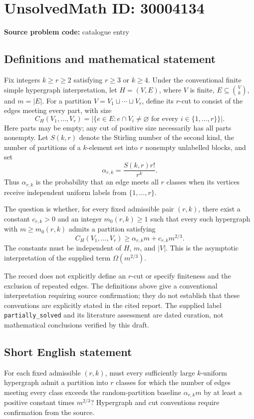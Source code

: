 \documentclass[11pt]{article}
\begin{document}
\section*{UnsolvedMath ID: 30004134}
\textbf{Source problem code:} catalogue entry
\subsection{Definitions and mathematical statement}
Fix integers \(k\ge r\ge2\) satisfying \(r\ge3\) or \(k\ge4\). Under the conventional finite simple hypergraph interpretation, let \(H=(V,E)\), where \(V\) is finite, \(E\subseteq\binom{V}{k}\), and \(m=|E|\). For a partition \(V=V_1\sqcup\cdots\sqcup V_r\), define its \(r\)-cut to consist of the edges meeting every part, with size
\[
C_H(V_1,\ldots,V_r)=\bigl|\{e\in E:e\cap V_i\ne\varnothing\text{ for every }i\in\{1,\ldots,r\}\}\bigr|.
\]
Here parts may be empty; any cut of positive size necessarily has all parts nonempty. Let \(S(k,r)\) denote the Stirling number of the second kind, the number of partitions of a \(k\)-element set into \(r\) nonempty unlabelled blocks, and set
\[
\alpha_{r,k}=\frac{S(k,r)r!}{r^k}.
\]
Thus \(\alpha_{r,k}\) is the probability that an edge meets all \(r\) classes when its vertices receive independent uniform labels from \(\{1,\ldots,r\}\).

The question is whether, for every fixed admissible pair \((r,k)\), there exist a constant \(c_{r,k}>0\) and an integer \(m_0(r,k)\ge1\) such that every such hypergraph with \(m\ge m_0(r,k)\) admits a partition satisfying
\[
C_H(V_1,\ldots,V_r)\ge\alpha_{r,k}m+c_{r,k}m^{2/3}.
\]
The constants must be independent of \(H\), \(m\), and \(|V|\). This is the asymptotic interpretation of the supplied term \(\Omega(m^{2/3})\).

The record does not explicitly define an \(r\)-cut or specify finiteness and the exclusion of repeated edges. The definitions above give a conventional interpretation requiring source confirmation; they do not establish that these conventions are explicitly stated in the cited report. The supplied label \texttt{partially\_solved} and its literature assessment are dated curation, not mathematical conclusions verified by this draft.
\subsection{Short English statement}
For each fixed admissible \((r,k)\), must every sufficiently large \(k\)-uniform hypergraph admit a partition into \(r\) classes for which the number of edges meeting every class exceeds the random-partition baseline \(\alpha_{r,k}m\) by at least a positive constant times \(m^{2/3}\)? Hypergraph and cut conventions require confirmation from the source.
\end{document}
